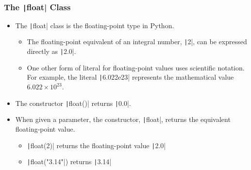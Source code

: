 \begin{frame}
    \frametitle{The \texttt|float| Class}

    \begin{itemize}
        \item The \texttt|float| class is the floating-point type in Python.
              \begin{itemize}
                  \item The floating-point equivalent of an integral number, \texttt|2|, can be expressed directly as \texttt|2.0|.
                  \item One other form of literal for floating-point values uses scientific notation. For example, the literal \texttt|6.022e23| represents the mathematical value \(6.022\times10^{23}\).
              \end{itemize}
        \item The constructor \texttt|float()| returns \texttt|0.0|.
        \item When given a parameter, the constructor, \texttt|float|, returns the equivalent floating-point value.
              \begin{itemize}
                  \item \texttt|float(2)| returns the floating-point value \texttt|2.0|
                  \item \texttt|float("3.14"|) returns \texttt|3.14|
              \end{itemize}
    \end{itemize}

\end{frame}

